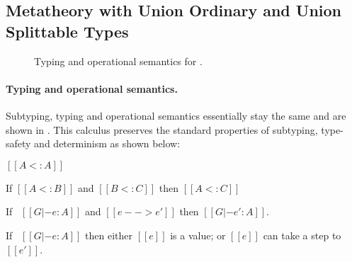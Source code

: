 \subsection{Metatheory with Union Ordinary and Union Splittable Types}


\begin{figure}[!h]
  \begin{small}
    \centering
  \end{small}
  \caption{Typing and operational semantics for \name.}
  \label{fig:union:rev:subtypos}
\end{figure}


\paragraph{Typing and operational semantics.}
Subtyping, typing and operational semantics essentially stay the same
and are shown in .
This calculus preserves the standard properties of subtyping, type-safety and
determinism as shown below:

\begin{lemma}
  $[[A <: A]]$
\label{lemma:union:rev:sub:refl}
\end{lemma}

\begin{lemma}
  If $[[A <: B]]$ and $[[B <: C]]$ then $[[A <: C]]$
\label{lemma:union:rev:sub:trans}
\end{lemma}

\begin{theorem}
\label{lemma:union:rev:simpl:preservation}
  If \ $[[G |- e : A]]$ and $[[e --> e']]$ then $[[G |- e' : A]]$.
\end{theorem}

\begin{theorem}[Progress]
\label{lemma:union:rev:simpl:progress}
If \ $[[G |- e : A]]$ then either $[[e]]$ is a value;
or $[[e]]$ can take a step to $[[e']]$.
\end{theorem}

